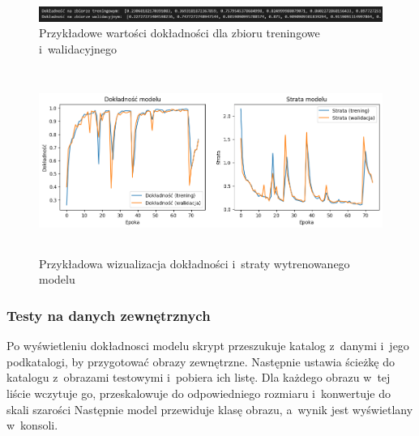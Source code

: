 \begin{figure}[ht]
	\centering
	\includegraphics[width=15.5cm]{resources/model/images/scr-standard-result.png}
	\caption{Przykładowe wartości dokładności dla zbioru treningowe i~walidacyjnego}
	\label{Fig:tests-wyniki-2}
\end{figure}
\FloatBarrier

\begin{figure}[ht]
	\centering
	\includegraphics[height=6cm]{resources/model/images/v2_epoch75.png}
	\caption{Przykładowa wizualizacja dokładności i~straty wytrenowanego modelu}
	\label{Fig:tests-wyniki-1}
\end{figure}
\FloatBarrier

\subsubsection{Testy na danych zewnętrznych}
Po wyświetleniu dokładnosci modelu skrypt przeszukuje katalog z~danymi i~jego podkatalogi, by przygotować obrazy zewnętrzne.
Następnie ustawia ścieżkę do katalogu z~obrazami testowymi i~pobiera ich listę.
Dla każdego obrazu w~tej liście wczytuje go, przeskalowuje do odpowiedniego rozmiaru i~konwertuje do skali szarości
Następnie model przewiduje klasę obrazu, a~wynik jest wyświetlany w~konsoli.